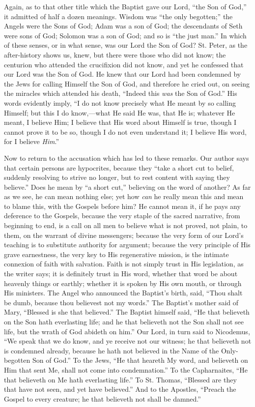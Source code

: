 Again, as to that other title which the Baptist
gave our Lord, ``the Son of God,'' it admitted of half a dozen meanings.
Wisdom was ``the only begotten;'' the Angels were the Sons of God; Adam
was a son of God; the descendants of Seth were sons of God; Solomon
was a son of God; and so is ``the just man.'' In which of these senses,
or in what sense, was our Lord the Son of God? St. Peter, as the
after-history shows us, knew, but there were those who did not know;
the centurion who attended the crucifixion did not know, and yet he
confessed that our Lord was the Son of God. He knew that our Lord had
been condemned by the Jews for calling Himself the Son of God, and
therefore he cried out, on seeing the miracles which attended his
death, ``Indeed this \emph{was} the Son of God.'' His words evidently
imply, ``I do not know precisely what He meant by so calling Himself;
but this I do know,—what He said He was, that He is; whatever He
meant, I believe Him; I believe that His word about Himself is true,
though I cannot prove it to be so, though I do not even understand it;
I believe His word, for I believe \emph{Him}.''

Now to return to the accusation which has led to
these remarks. Our author says that certain persons are hypocrites,
because they ``take a short cut to belief, suddenly resolving to strive
no longer, but to rest content with saying they believe.'' Does he mean
by ``a short cut,'' believing on the word of another? As far as we see,
he can mean nothing else; yet how \emph{can} he really mean this and
mean to blame this, with the Gospels before him? He cannot mean it, if
he pays any deference to the Gospels, because the very staple of the
sacred narrative, from beginning to end, is a call on all men to
believe what is not proved, not plain, to them, on the warrant of
divine messengers; because the very form of our Lord's teaching is to
substitute authority for argument; because the very principle of His
grave earnestness, the very key to His regenerative mission, is the
intimate connexion of faith with salvation. Faith is not simply trust
in His legislation, as the writer says; it is definitely trust in His
word, whether that word be about heavenly things or earthly; whether
it is spoken by His own mouth, or through His ministers. The Angel who
announced the Baptist's birth, said, ``Thou shalt be dumb, because thou
believest not my words.'' The Baptist's mother said of Mary, ``Blessed
is she that believed.'' The Baptist himself said, ``He that believeth on
the Son hath everlasting life; and he that believeth not the Son shall
not see life, but the wrath of God abideth on him.'' Our Lord, in turn
said to Nicodemus, ``We speak that we do know, and ye receive not our
witness; he that believeth not is condemned already, because he hath
not believed in the Name of the Only-begotten Son of God.'' To the
Jews, ``He that heareth My word, and believeth on Him that sent Me,
shall not come into condemnation.'' To the Capharnaites, ``He that
believeth on Me hath everlasting life.'' To St. Thomas, ``Blessed
are they that have not seen, and yet have believed.'' And to the
Apostles, ``Preach the Gospel to every creature; he that believeth not
shall be damned.''

